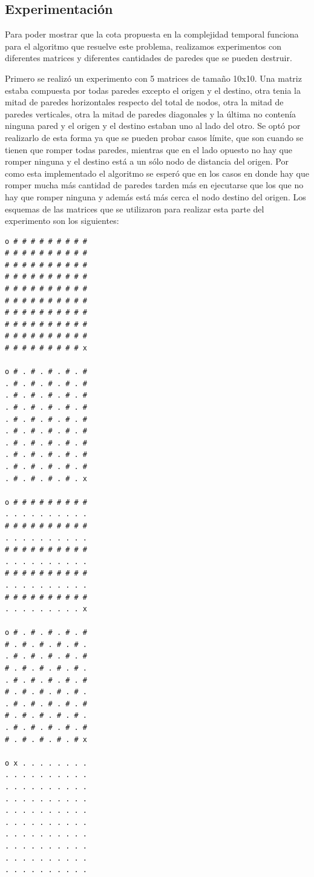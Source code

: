     \subsection{Experimentación}

	Para poder mostrar que la cota propuesta en la complejidad temporal funciona para el algoritmo que resuelve este problema, realizamos experimentos con diferentes matrices y diferentes cantidades de paredes que se pueden destruir.

  Primero se realizó un experimento con 5 matrices de tamaño 10x10. Una matriz estaba compuesta por todas paredes excepto el origen y el destino, otra tenia la mitad de paredes horizontales respecto del total de nodos, otra la mitad de paredes verticales, otra la mitad de paredes diagonales y la última no contenía ninguna pared y el origen y el destino estaban uno al lado del otro. Se optó por realizarlo de esta forma ya que se pueden probar casos límite, que son cuando se tienen que romper todas paredes, mientras que en el lado opuesto no hay que romper ninguna y el destino está a un sólo nodo de distancia del origen. Por como esta implementado el algoritmo se esperó que en los casos en donde hay que romper mucha más cantidad de paredes tarden más en ejecutarse que los que no hay que romper ninguna y además está más cerca el nodo destino del origen. Los esquemas de las matrices que se utilizaron para realizar esta parte del experimento son los siguientes:

 \begin{codesnippet}
            \begin{verbatim}
o # # # # # # # # #
# # # # # # # # # #
# # # # # # # # # #
# # # # # # # # # #
# # # # # # # # # #
# # # # # # # # # #
# # # # # # # # # #
# # # # # # # # # #
# # # # # # # # # #
# # # # # # # # # x

o # . # . # . # . #
. # . # . # . # . #
. # . # . # . # . #
. # . # . # . # . #
. # . # . # . # . #
. # . # . # . # . #
. # . # . # . # . #
. # . # . # . # . #
. # . # . # . # . #
. # . # . # . # . x

o # # # # # # # # #
. . . . . . . . . .
# # # # # # # # # #
. . . . . . . . . .
# # # # # # # # # #
. . . . . . . . . .
# # # # # # # # # #
. . . . . . . . . .
# # # # # # # # # #
. . . . . . . . . x

o # . # . # . # . #
# . # . # . # . # .
. # . # . # . # . #
# . # . # . # . # .
. # . # . # . # . #
# . # . # . # . # .
. # . # . # . # . #
# . # . # . # . # .
. # . # . # . # . #
# . # . # . # . # x

o x . . . . . . . .
. . . . . . . . . .
. . . . . . . . . .
. . . . . . . . . .
. . . . . . . . . .
. . . . . . . . . .
. . . . . . . . . .
. . . . . . . . . .
. . . . . . . . . .
. . . . . . . . . .

\end{verbatim}
            \end{codesnippet}

